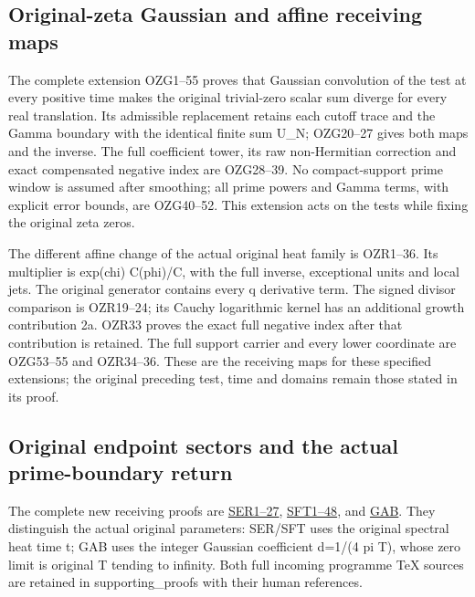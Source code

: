 \documentclass[
  10pt,
  a4paper,
]{article}
\begin{document}
\subsection{Original-zeta Gaussian and affine receiving
maps}\label{original-zeta-gaussian-and-affine-receiving-maps}

The complete extension OZG1--55 proves that Gaussian convolution of the
test at every positive time makes the original trivial-zero scalar sum
diverge for every real translation. Its admissible replacement retains
each cutoff trace and the Gamma boundary with the identical finite sum
U\_N; OZG20--27 gives both maps and the inverse. The full coefficient
tower, its raw non-Hermitian correction and exact compensated negative
index are OZG28--39. No compact-support prime window is assumed after
smoothing; all prime powers and Gamma terms, with explicit error bounds,
are OZG40--52. This extension acts on the tests while fixing the
original zeta zeros.

The different affine change of the actual original heat family is
OZR1--36. Its multiplier is exp(chi) C(phi)/C, with the full inverse,
exceptional units and local jets. The original generator contains every
q derivative term. The signed divisor comparison is OZR19--24; its
Cauchy logarithmic kernel has an additional growth contribution 2a.
OZR33 proves the exact full negative index after that contribution is
retained. The full support carrier and every lower coordinate are
OZG53--55 and OZR34--36. These are the receiving maps for these
specified extensions; the original preceding test, time and domains
remain those stated in its proof.

\subsection{Original endpoint sectors and the actual prime-boundary
return}\label{original-endpoint-sectors-and-the-actual-prime-boundary-return}

The complete new receiving proofs are
\href{SECTORIAL_ENDPOINT_ZERO_TRACE_RETURN.md}{SER1--27},
\href{SECTORIAL_FILTER_TRACE_DERIVATION.md}{SFT1--48}, and
\href{GAUSSIAN_ARITHMETIC_BOUNDARY_RETURN.md}{GAB}. They distinguish the
actual original parameters: SER/SFT uses the original spectral heat time
t; GAB uses the integer Gaussian coefficient d=1/(4 pi T), whose zero
limit is original T tending to infinity. Both full incoming programme
TeX sources are retained in supporting\_proofs with their human
references.
\end{document}
